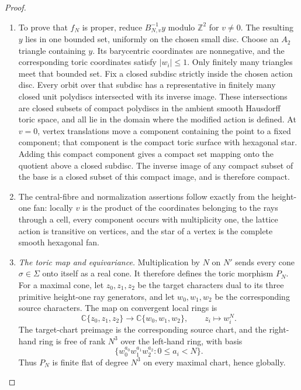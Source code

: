 \begin{proof}
\begin{enumerate}[label=\arabic*.,leftmargin=*]
\item To prove that $f_N$ is proper, reduce
$B_{N,v}^{-1}y$ modulo $\mathbb Z^2$ for $v\ne0$. The resulting $y$
lies in one bounded set, uniformly on the chosen small disc. Choose
an $A_2$ triangle containing $y$. Its barycentric coordinates are
nonnegative, and the corresponding toric coordinates satisfy
$|w_i|\le1$. Only finitely many triangles meet that bounded set.
Fix a closed subdisc strictly inside the chosen action disc.
Every orbit over that subdisc has a representative in finitely
many closed unit polydiscs intersected with its inverse image.
These intersections are closed subsets of compact polydiscs
in the ambient smooth Hausdorff toric space, and all lie in the
domain where the modified action is defined. At $v=0$, vertex translations move a component containing the
point to a fixed component; that component is the compact toric
surface with hexagonal star. Adding this compact component gives
a compact set mapping onto the quotient above a closed subdisc.
The inverse image of any compact subset of the base is a closed
subset of this compact image, and is therefore compact.

\item The central-fibre and
normalization assertions follow exactly from the height-one fan: locally
$v$ is the product of the coordinates belonging to the rays through a
cell, every component occurs with multiplicity one, the lattice action is
transitive on vertices, and the star of a vertex is the complete smooth
hexagonal fan.

\item \medskip\noindent
\emph{The toric map and equivariance.}
Multiplication by $N$ on $N'$ sends every cone $\sigma\in\Sigma$ onto
itself as a real cone.  It therefore defines the toric morphism $P_N$.
For a maximal cone, let $z_0,z_1,z_2$ be the target characters dual to its
three primitive height-one ray generators, and let $w_0,w_1,w_2$ be the
corresponding source characters.  The map on convergent local rings is
\begin{equation}
 \mathbb C\{z_0,z_1,z_2\}\longrightarrow
\mathbb C\{w_0,w_1,w_2\},\qquad z_i\longmapsto w_i^N.
 \label{wb:cusp-cover-maximal-chart-map}
\end{equation}
The target-chart preimage is the corresponding source chart, and the
right-hand ring is free of rank $N^3$ over the left-hand ring, with basis
\[
 \{w_0^{a_0}w_1^{a_1}w_2^{a_2}:0\le a_i<N\}.
\]
Thus $P_N$ is finite flat of degree $N^3$ on every maximal chart, hence
globally.


\end{enumerate}
\end{proof}
